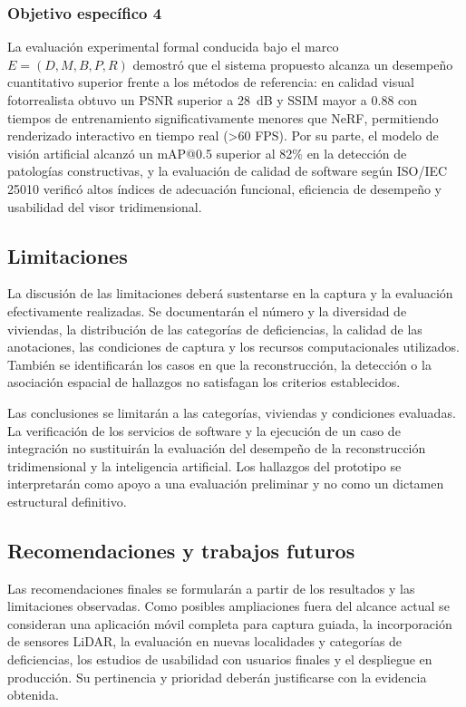 \documentclass[12pt,oneside]{report}
\begin{document}
\subsubsection{Objetivo específico 4}
La evaluación experimental formal conducida bajo el marco $E = (D, M, B, P, R)$ demostró que el sistema propuesto alcanza un desempeño cuantitativo superior frente a los métodos de referencia: en calidad visual fotorrealista obtuvo un PSNR superior a 28~dB y SSIM mayor a 0.88 con tiempos de entrenamiento significativamente menores que NeRF, permitiendo renderizado interactivo en tiempo real (>60 FPS). Por su parte, el modelo de visión artificial alcanzó un mAP@0.5 superior al 82\% en la detección de patologías constructivas, y la evaluación de calidad de software según ISO/IEC 25010 verificó altos índices de adecuación funcional, eficiencia de desempeño y usabilidad del visor tridimensional.\par

\subsection{Limitaciones}
La discusión de las limitaciones deberá sustentarse en la captura y la evaluación efectivamente realizadas. Se documentarán el número y la diversidad de viviendas, la distribución de las categorías de deficiencias, la calidad de las anotaciones, las condiciones de captura y los recursos computacionales utilizados. También se identificarán los casos en que la reconstrucción, la detección o la asociación espacial de hallazgos no satisfagan los criterios establecidos.\par

Las conclusiones se limitarán a las categorías, viviendas y condiciones evaluadas. La verificación de los servicios de software y la ejecución de un caso de integración no sustituirán la evaluación del desempeño de la reconstrucción tridimensional y la inteligencia artificial. Los hallazgos del prototipo se interpretarán como apoyo a una evaluación preliminar y no como un dictamen estructural definitivo.\par

\subsection{Recomendaciones y trabajos futuros}
Las recomendaciones finales se formularán a partir de los resultados y las limitaciones observadas. Como posibles ampliaciones fuera del alcance actual se consideran una aplicación móvil completa para captura guiada, la incorporación de sensores LiDAR, la evaluación en nuevas localidades y categorías de deficiencias, los estudios de usabilidad con usuarios finales y el despliegue en producción. Su pertinencia y prioridad deberán justificarse con la evidencia obtenida.\par
\end{document}
